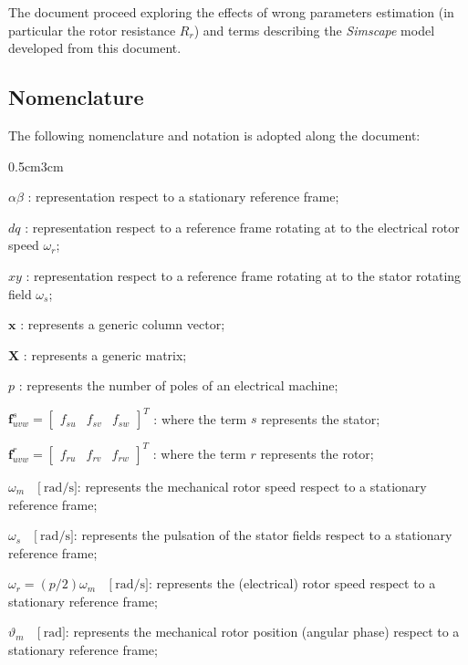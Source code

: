 \documentclass[12pt,a4paper]{scrartcl}
\newenvironment{myitemize_2}
{ \begin{itemize}[topsep=2pt]
		\setlength{\topsep}{4pt}
		\setlength{\itemsep}{4pt}
		\setlength{\parskip}{4pt}
		\setlength{\parsep}{4pt}     }
	{ \end{itemize}                  }
\begin{document}
\begin{onehalfspace}
The document proceed exploring the effects of wrong parameters estimation (in particular the rotor resistance $R_r$) and terms describing the \textit{Simscape} model developed from this document. 

\subsection{Nomenclature}
The following nomenclature and notation is adopted along the document:
\begin{changemargin}{0.5cm}{3cm} 
\begin{myitemize_2}
	\item[--] $\alpha\beta$ : representation respect to a stationary reference frame;	
	\item[--] $dq$ : representation respect to a reference frame rotating at to the electrical rotor speed $\omega_{r}$;	
	\item[--] $xy$ : representation respect to a reference frame rotating at to the stator rotating field $\omega_{s}$;
	\item[--] $\mathbf{x}$ : represents a generic column vector;	
	\item[--] $\mathbf{X}$ : represents a generic matrix;
	\item[--] $p$ : represents the number of poles of an electrical machine;
	\item[--] $\mathbf{f}_{uvw}^s =\begin{bmatrix} f_{su} & f_{sv} & f_{sw} \end{bmatrix}^T$ : where the term $s$ represents the stator;
	\item[--] $\mathbf{f}_{uvw}^r =\begin{bmatrix} f_{ru} & f_{rv} & f_{rw} \end{bmatrix}^T$ : where the term $r$ represents the rotor;
	\item[--] $\omega_m\quad\Big[\SI{}{\radian\per\second}\Big]$: represents the mechanical rotor speed respect to a stationary reference frame;
	\item[--] $\omega_s\quad\Big[\SI{}{\radian\per\second}\Big]$: represents the pulsation of the stator fields respect to a stationary reference frame;
	\item[--] $\omega_r=(p/2)\omega_m\quad\Big[\SI{}{\radian\per\second}\Big]$: represents the (electrical) rotor speed respect to a stationary reference frame;
	\item[--] $\vartheta_m\quad\Big[\SI{}{\radian}\Big]$: represents the mechanical rotor position (angular phase) respect to a stationary reference frame;

\end{myitemize_2}
\end{changemargin}
\end{onehalfspace}
\end{document}
